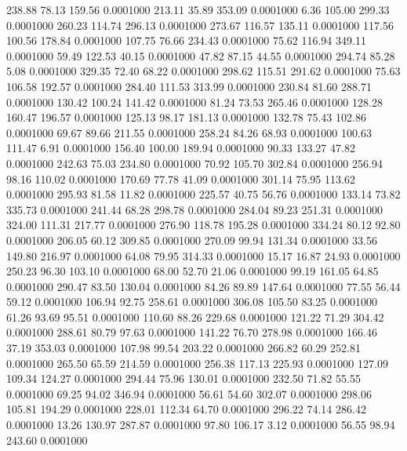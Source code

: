  238.88   78.13  159.56   0.0001000
 213.11   35.89  353.09   0.0001000
   6.36  105.00  299.33   0.0001000
 260.23  114.74  296.13   0.0001000
 273.67  116.57  135.11   0.0001000
 117.56  100.56  178.84   0.0001000
 107.75   76.66  234.43   0.0001000
  75.62  116.94  349.11   0.0001000
  59.49  122.53   40.15   0.0001000
  47.82   87.15   44.55   0.0001000
 294.74   85.28    5.08   0.0001000
 329.35   72.40   68.22   0.0001000
 298.62  115.51  291.62   0.0001000
  75.63  106.58  192.57   0.0001000
 284.40  111.53  313.99   0.0001000
 230.84   81.60  288.71   0.0001000
 130.42  100.24  141.42   0.0001000
  81.24   73.53  265.46   0.0001000
 128.28  160.47  196.57   0.0001000
 125.13   98.17  181.13   0.0001000
 132.78   75.43  102.86   0.0001000
  69.67   89.66  211.55   0.0001000
 258.24   84.26   68.93   0.0001000
 100.63  111.47    6.91   0.0001000
 156.40  100.00  189.94   0.0001000
  90.33  133.27   47.82   0.0001000
 242.63   75.03  234.80   0.0001000
  70.92  105.70  302.84   0.0001000
 256.94   98.16  110.02   0.0001000
 170.69   77.78   41.09   0.0001000
 301.14   75.95  113.62   0.0001000
 295.93   81.58   11.82   0.0001000
 225.57   40.75   56.76   0.0001000
 133.14   73.82  335.73   0.0001000
 241.44   68.28  298.78   0.0001000
 284.04   89.23  251.31   0.0001000
 324.00  111.31  217.77   0.0001000
 276.90  118.78  195.28   0.0001000
 334.24   80.12   92.80   0.0001000
 206.05   60.12  309.85   0.0001000
 270.09   99.94  131.34   0.0001000
  33.56  149.80  216.97   0.0001000
  64.08   79.95  314.33   0.0001000
  15.17   16.87   24.93   0.0001000
 250.23   96.30  103.10   0.0001000
  68.00   52.70   21.06   0.0001000
  99.19  161.05   64.85   0.0001000
 290.47   83.50  130.04   0.0001000
  84.26   89.89  147.64   0.0001000
  77.55   56.44   59.12   0.0001000
 106.94   92.75  258.61   0.0001000
 306.08  105.50   83.25   0.0001000
  61.26   93.69   95.51   0.0001000
 110.60   88.26  229.68   0.0001000
 121.22   71.29  304.42   0.0001000
 288.61   80.79   97.63   0.0001000
 141.22   76.70  278.98   0.0001000
 166.46   37.19  353.03   0.0001000
 107.98   99.54  203.22   0.0001000
 266.82   60.29  252.81   0.0001000
 265.50   65.59  214.59   0.0001000
 256.38  117.13  225.93   0.0001000
 127.09  109.34  124.27   0.0001000
 294.44   75.96  130.01   0.0001000
 232.50   71.82   55.55   0.0001000
  69.25   94.02  346.94   0.0001000
  56.61   54.60  302.07   0.0001000
 298.06  105.81  194.29   0.0001000
 228.01  112.34   64.70   0.0001000
 296.22   74.14  286.42   0.0001000
  13.26  130.97  287.87   0.0001000
  97.80  106.17    3.12   0.0001000
  56.55   98.94  243.60   0.0001000
